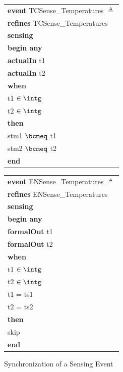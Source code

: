 \begin{figure}
\begin{sffamily}
\begin{minipage}{0.5\linewidth}
\begin{tabular}{l}
\textbf{event} TCSense\_Temperatures $\triangleq$ \\
\textbf{refines} TCSense\_Temperatures\\
\textbf{sensing} \\
\textbf{begin any} \\
\quad\textbf{actualIn} t1 \\
\quad\textbf{actualIn} t2 \\
\textbf{when} \\
\quad t1 $\in \intg$ \\
\quad t2 $\in \intg$ \\
\textbf{then} \\
\quad stm1 $\bcmeq$ t1 \\
\quad stm2 $\bcmeq$ t2 \\
\textbf{end}
\end{tabular}
\end{minipage}
\begin{minipage}{0.5\linewidth}
\begin{tabular}{l}
\textbf{event} ENSense\_Temperatures $\triangleq$ \\
\textbf{refines} ENSense\_Temperatures \\
\textbf{sensing} \\
\textbf{begin any} \\
\quad\textbf{formalOut} t1 \\
\quad\textbf{formalOut} t2 \\
\textbf{when} \\
\quad t1 $\in \intg$ \\
\quad t2 $\in \intg$ \\
\quad t1 = ts1 \\
\quad t2 = ts2 \\
\textbf{then} \\
\quad skip \\
\textbf{end}
\end{tabular}
\end{minipage}
\end{sffamily}
	\caption{Synchronization of a Sensing Event}
	\label{fig:SensingEvent}
\end{figure}
%
